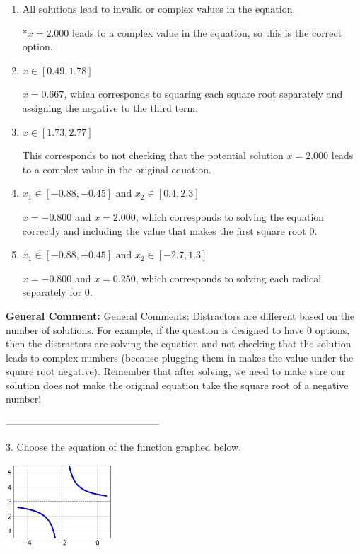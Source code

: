 \documentclass{extbook}[14pt]
\begin{document}
\begin{enumerate}[label=\Alph*.] 
\item $ \text{All solutions lead to invalid or complex values in the equation.} $ 

 *$x = 2.000$ leads to a complex value in the equation, so this is the correct option. 
\item $ x \in [0.49,1.78] $ 

 $x = 0.667$, which corresponds to squaring each square root separately and assigning the negative to the third term. 
\item $ x \in [1.73,2.77] $ 

 This corresponds to not checking that the potential solution $x = 2.000$ leads to a complex value in the original equation. 
\item $ x_1 \in [-0.88, -0.45] \text{ and } x_2 \in [0.4,2.3] $ 

 $x = -0.800$ and $x = 2.000$, which corresponds to solving the equation correctly and including the value that makes the first square root 0. 
\item $ x_1 \in [-0.88, -0.45] \text{ and } x_2 \in [-2.7,1.3] $ 

 $x = -0.800$ and $x = 0.250$, which corresponds to solving each radical separately for 0. 
\end{enumerate} 
 
\textbf{General Comment:} General Comments: Distractors are different based on the number of solutions. For example, if the question is designed to have 0 options, then the distractors are solving the equation and not checking that the solution leads to complex numbers (because plugging them in makes the value under the square root negative). Remember that after solving, we need to make sure our solution does not make the original equation take the square root of a negative number! 

-----------------------------------------------

3. Choose the equation of the function graphed below.
\begin{center} \includegraphics[width=0.3\textwidth]{../Figures/rationalGraphToEquationA.png} \end{center} 
\end{document}

